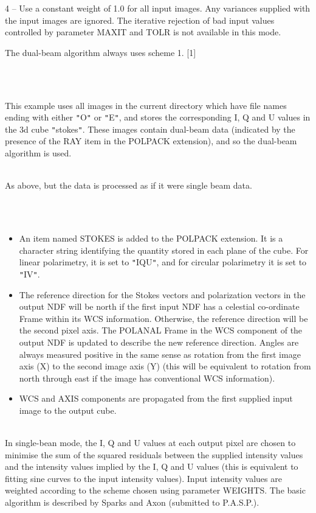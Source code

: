 \documentclass[twoside,11pt]{article}
\renewcommand{\_}{\texttt{\symbol{95}}}
\newlength{\sstexampleslength}
\newcommand{\sstexamples}[1]{
   \item[Examples:] \mbox{} \\
   \vspace{-3.5ex}
   \begin{description}
      #1
   \end{description}
}
\newcommand{\sstexamplesubsection}[2]{\sloppy
\item[\parbox{\sstexampleslength}{\ssttt #1}] \mbox{} \vspace{1.0ex}
\\ #2 }
\newcommand{\sstnotes}[1]{\item[Notes:] \mbox{} \\[1.3ex] #1}
\newcommand{\sstdiytopic}[2]{\item[{\hspace{-0.35em}#1\hspace{-0.35em}:}]
\mbox{} \\[1.3ex] #2}
\newcommand{\sstitemlist}[1]{
  \mbox{} \\
  \vspace{-3.5ex}
  \begin{itemize}
     #1
  \end{itemize}
}
\newcommand{\sstitem}{\item}
\newcommand{\sstexamples}[1]{
      \item[Examples:] \\
      \begin{description}
         #1
      \end{description}
      \\
   }
\newcommand{\sstexamplesubsection}[2]{\item[{\ssttt #1}] #2}
\newcommand{\sstnotes}[1]{\item[Notes:] #1 }
\newcommand{\sstdiytopic}[2]{\item[{#1}] #2 }
\newcommand{\sstitemlist}[1]{
      \begin{itemize}
         #1
      \end{itemize}
      \\
   }
\newcommand{\sstitem}{\item}
\begin{document}
{{{{            \sstitem
            4 -- Use a constant weight of 1.0 for all input images. Any
            variances supplied with the input images are ignored. The
            iterative rejection of bad input values controlled by parameter
            MAXIT and TOLR is not available in this mode.

         }
         The dual-beam algorithm always uses scheme 1. [1]
      }
   }
   \sstexamples{
      \sstexamplesubsection{
         polcal {\tt "}$*$\_O,$*$\_E{\tt "} stokes
      }{
         This example uses all images in the current directory which have
         file names ending with either {\tt "}\_O{\tt "} or {\tt "}\_E{\tt "}, and stores the
         corresponding I, Q and U values in the 3d cube {\tt "}stokes{\tt "}. These
         images contain dual-beam data (indicated by the presence of the
         RAY item in the POLPACK extension), and so the dual-beam
         algorithm is used.
      }
      \sstexamplesubsection{
         polcal {\tt "}$*$\_O,$*$\_E{\tt "} stokes nodualbeam
      }{
         As above, but the data is processed as if it were single beam data.
      }
   }
   \sstnotes{
      \sstitemlist{

         \sstitem
         An item named STOKES is added to the POLPACK extension. It is a
         character string identifying the quantity stored in each plane of
         the cube. For linear polarimetry, it is set to {\tt "}IQU{\tt "}, and for
         circular polarimetry it is set to {\tt "}IV{\tt "}.

         \sstitem
         The reference direction for the Stokes vectors and polarization
         vectors in the output NDF will be north if the first input NDF
         has a celestial co-ordinate Frame within its WCS information. Otherwise,
         the reference direction will be the second pixel axis. The POLANAL
         Frame in the WCS component of the output NDF is updated to describe
         the new reference direction. Angles are always measured positive in the
         same sense as rotation from the first image axis (X) to the second image
         axis (Y) (this will be equivalent to rotation from north through
         east if the image has conventional WCS information).

         \sstitem
         WCS and AXIS components are propagated from the first supplied
         input image to the output cube.
      }
   }
   \sstdiytopic{
      The Single-beam Algorithm
   }{
      In single-bean mode, the I, Q and U values at each output pixel are
      chosen to minimise the sum of the squared residuals between the
      supplied intensity values and the intensity values implied by the I,
      Q and U values (this is equivalent to fitting sine curves to the
      input intensity values). Input intensity values are weighted
      according to the scheme chosen using parameter WEIGHTS. The basic
      algorithm is described by Sparks and Axon (submitted to P.A.S.P.).

}}
\end{document}
